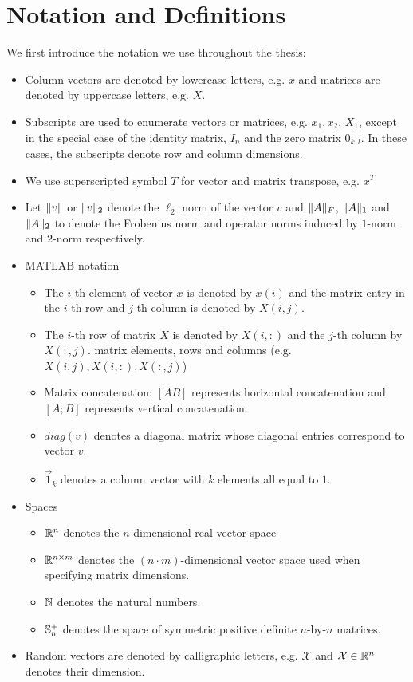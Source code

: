 %
\chapter{Notation and Definitions}\label{chap:notation}

We first introduce the notation we use throughout the thesis:
\begin{itemize}
\item Column vectors are denoted by lowercase letters, e.g. $x$ and matrices are denoted by uppercase letters, e.g. $X$.
\item Subscripts are used to enumerate vectors or matrices, e.g. $x_1, x_2$, $X_1$, except in the
special case of the identity matrix, $I_n$ and the zero matrix $0_{k,l}$. In these cases, the subscripts denote row and column dimensions.
\item We use superscripted symbol $T$ for vector and matrix transpose, e.g. $x^T$
\item Let $\lVert v\rVert$ or $\lVert v\rVert_2$ denote the $\ell_2$ norm of the vector $v$ and $\lVert A\rVert_F$, $\lVert A\rVert_1$ and $\lVert A\rVert_2$ to denote the Frobenius norm and operator norms induced by $1$-norm and $2$-norm respectively.
\item MATLAB notation~\cite{golub}
\begin{itemize}
\item The $i$-th element of vector $x$ is denoted by $x(i)$ and the matrix entry in the $i$-th row and $j$-th column is denoted by $X(i,j)$.
\item The $i$-th row of matrix $X$ is denoted by $X(i,:)$ and the $j$-th column by $X(:,j)$.
 matrix elements, rows and columns {(e.g. ${X(i,j), X(i,:), X(:,j)}$)}
\item Matrix concatenation: $[A B]$ represents horizontal concatenation and $[A; B]$ represents vertical concatenation.
\item $diag(v)$ denotes a diagonal matrix whose diagonal entries correspond to vector $v$.
\item $\vec{1}_k$ denotes a column vector with $k$ elements all equal to $1$.
\end{itemize}
\item Spaces
\begin{itemize}
 \item $\mathbb{R}^n$ denotes the $n$-dimensional real vector space
 \item $\mathbb{R}^{n\times m}$ denotes the $(n \cdot m)$-dimensional vector space used when specifying
 matrix dimensions.
 \item $\mathbb{N}$ denotes the natural numbers.
 \item $\mathbb{S}_n^{+}$ denotes the space of symmetric positive definite $n$-by-$n$ matrices.
\end{itemize}
\item Random vectors are denoted by calligraphic letters, e.g. $\mathcal{X}$ and $\mathcal{X} \in \mathbb{R}^n$ denotes their dimension.
\end{itemize}


